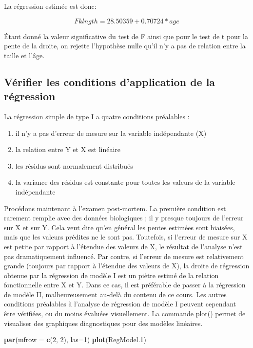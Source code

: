\documentclass[12pt,]{book}
\newenvironment{Shaded}{\begin{snugshade}}{\end{snugshade}}
\newcommand{\DataTypeTok}[1]{\textcolor[rgb]{0.27,0.27,0.27}{#1}}
\newcommand{\DecValTok}[1]{\textcolor[rgb]{0.06,0.06,0.06}{#1}}
\newcommand{\FloatTok}[1]{\textcolor[rgb]{0.06,0.06,0.06}{#1}}
\newcommand{\KeywordTok}[1]{\textcolor[rgb]{0.27,0.27,0.27}{\textbf{#1}}}
\newcommand{\NormalTok}[1]{#1}
\providecommand{\tightlist}{%
  \setlength{\itemsep}{0pt}\setlength{\parskip}{0pt}}
\begin{document}
La régression estimée est donc:

\[ Fklngth = 28.50359 + 0.70724 * age\]

Étant donné la valeur significative du test de F ainsi que pour le test de t pour la pente de la droite, on rejette l'hypothèse nulle qu'il n'y a pas de relation entre la taille et l'âge.

\hypertarget{vuxe9rifier-les-conditions-dapplication-de-la-ruxe9gression}{%
\subsection{Vérifier les conditions d'application de la régression}\label{vuxe9rifier-les-conditions-dapplication-de-la-ruxe9gression}}

La régression simple de type I a quatre conditions préalables :

\begin{enumerate}
\def\labelenumi{\arabic{enumi}.}
\tightlist
\item
  il n'y a pas d'erreur de mesure sur la variable indépendante (X)
\item
  la relation entre Y et X est linéaire
\item
  les résidus sont normalement distribués
\item
  la variance des résidus est constante pour toutes les valeurs de la variable indépendante
\end{enumerate}

Procédons maintenant à l'examen post-mortem. La première
condition est rarement remplie avec des données biologiques ; il y
presque toujours de l'erreur sur X et sur Y. Cela veut dire qu'en
général les pentes estimées sont biaisées, mais que les valeurs prédites
ne le sont pas. Toutefois, si l'erreur de mesure sur X est petite par
rapport à l'étendue des valeurs de X, le résultat de l'analyse n'est pas
dramatiquement influencé. Par contre, si l'erreur de mesure est
relativement grande (toujours par rapport à l'étendue des valeurs de
X), la droite de régression obtenue par la régression de modèle I est
un piètre estimé de la relation fonctionnelle entre X et Y. Dans ce cas,
il est préférable de passer à la régression de modèle II,
malheureusement au-delà du contenu de ce cours.
Les autres conditions préalables à l'analyse de régression de modèle I
peuvent cependant être vérifiées, ou du moins évaluées visuellement.
La commande plot() permet de visualiser des graphiques
diagnostiques pour des modèles linéaires.

\begin{Shaded}
\begin{Highlighting}[]
\KeywordTok{par}\NormalTok{(}\DataTypeTok{mfrow =} \KeywordTok{c}\NormalTok{(}\DecValTok{2}\NormalTok{, }\DecValTok{2}\NormalTok{), }\DataTypeTok{las=}\DecValTok{1}\NormalTok{)}
\KeywordTok{plot}\NormalTok{(RegModel}\FloatTok{.1}\NormalTok{)}
\end{Highlighting}
\end{Shaded}
\end{document}
